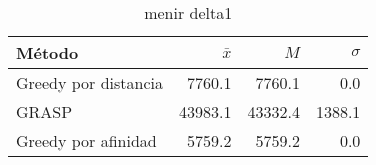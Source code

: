 \begin{table}[h!]
\centering
\begin{tabular}{|l|r|r|r|}
\hline
              Método &  $\bar{x}$ &     $M$ &  $\sigma$ \\
\hline
Greedy por distancia &     7760.1 &  7760.1 &       0.0 \\
               GRASP &    43983.1 & 43332.4 &    1388.1 \\
 Greedy por afinidad &     5759.2 &  5759.2 &       0.0 \\
\hline
\end{tabular}
\caption{menir delta1}
\label{menir_delta1}
\end{table}
